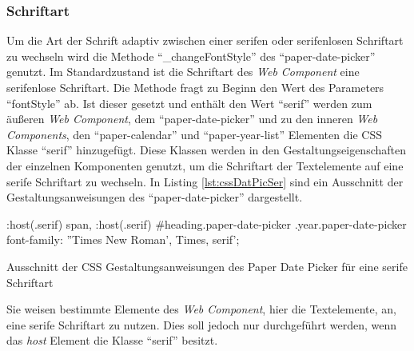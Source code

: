 \documentclass[12pt, paper=a4, bibtotoc, toc=listof, headsepline=true, numbers=endperiod]{scrreprt}
\begin{document}
		\subsubsection{Schriftart}
		Um die Art der Schrift adaptiv zwischen einer serifen oder serifenlosen Schriftart zu wechseln wird die Methode \enquote{\_changeFontStyle} des \enquote{paper-date-picker} genutzt. Im Standardzustand ist die Schriftart des \emph{Web Component} eine serifenlose Schriftart. Die Methode fragt zu Beginn den Wert des Parameters \enquote{fontStyle} ab. Ist dieser gesetzt und enthält den Wert \enquote{serif} werden zum äußeren \emph{Web Component}, dem \enquote{paper-date-picker} und zu den inneren \emph{Web Components}, den \enquote{paper-calendar} und \enquote{paper-year-list} Elementen die \ac{CSS} Klasse \enquote{serif} hinzugefügt. Diese Klassen werden in den Gestaltungseigenschaften der einzelnen Komponenten genutzt, um die Schriftart der Textelemente auf eine serife Schriftart zu wechseln. In Listing \ref{lst:cssDatPicSer} sind ein Ausschnitt der Gestaltungsanweisungen des \enquote{paper-date-picker} dargestellt.
			\begin{listing}
			\begin{CSScode*}{}
:host(.serif) span, :host(.serif) #heading.paper-date-picker .year.paper-date-picker{
	font-family: ''Times New Roman', Times, serif';
}
			\end{CSScode*}
			\caption[CSS des Paper Date Picker für serife Schriftart]{Ausschnitt der CSS Gestaltungsanweisungen des Paper Date Picker für eine serife Schriftart}
			\label{lst:cssDatPicSer}
		\end{listing}\noindent
		Sie weisen bestimmte Elemente des \emph{Web Component}, hier die Textelemente, an, eine serife Schriftart zu nutzen. Dies soll jedoch nur durchgeführt werden, wenn das \emph{host} Element die Klasse \enquote{serif} besitzt.
\end{document}

